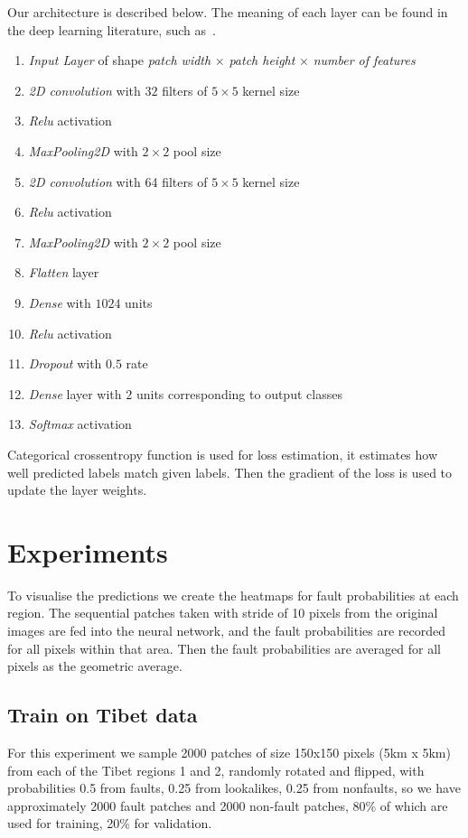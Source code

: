 \documentclass[11pt,a4paper]{article}
\begin{document}
Our architecture is described below. The meaning of each layer can be found in the deep learning literature, such
as~\cite{cnn-tutorial}.

\begin{enumerate}
\item \textit{Input Layer} of shape \textit{patch width} $\times$ \textit{patch height} $\times$ \textit{number of features}
\item \textit{2D convolution} with $32$ filters of $5 \times 5$ kernel size
\item \textit{Relu} activation
\item \textit{MaxPooling2D} with $2 \times 2$ pool size
\item \textit{2D convolution} with 64 filters of $5 \times 5$ kernel size
\item \textit{Relu} activation
\item \textit{MaxPooling2D} with $2 \times 2$ pool size
\item \textit{Flatten} layer
\item \textit{Dense} with $1024$ units
\item \textit{Relu} activation
\item \textit{Dropout} with $0.5$ rate
\item \textit{Dense} layer with $2$ units corresponding to output classes
\item \textit{Softmax} activation
\end{enumerate}
Categorical crossentropy function is used for loss estimation, it estimates how well predicted labels match given labels.
Then the gradient of the loss is used to update the layer weights.


\section{Experiments}
To visualise the predictions we create the heatmaps for fault probabilities at each region. The sequential patches
taken with stride of 10 pixels from the original images are fed into the neural network, and the fault probabilities are
recorded for all pixels within that area. Then the fault probabilities are averaged for all pixels as the geometric average.


\subsection{Train on Tibet data}
For this experiment we sample 2000 patches of size 150x150 pixels (5km x 5km) from each of the Tibet regions 1 and 2,
randomly rotated and flipped, with probabilities 0.5 from faults, 0.25 from lookalikes, 0.25 from nonfaults, so we have
approximately 2000 fault patches and 2000 non-fault patches, 80\% of which are used for training, 20\% for validation.
\end{document}
